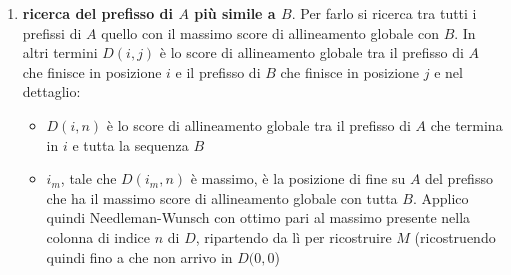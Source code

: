 \documentclass[a4paper,12pt, oneside]{book}
\begin{document}
\begin{enumerate}
  \item \textbf{ricerca del prefisso di $A$ più simile a $B$}. Per farlo si
  ricerca tra tutti i prefissi di $A$ quello con il massimo score di
  allineamento globale con $B$. In altri termini $D(i,j)$ è lo score di
  allineamento globale tra il prefisso di $A$ che finisce in posizione $i$ e il
  prefisso di $B$ che finisce in posizione $j$ e nel dettaglio: 
  \begin{itemize}
    \item $D(i,n)$ è lo score di allineamento globale tra il prefisso di $A$ che
    termina in $i$ e tutta la sequenza $B$
    \item $i_m$, tale che $D(i_m,n)$ è massimo, è la posizione di fine su $A$
    del prefisso che ha il massimo score di allineamento globale con tutta
    $B$. Applico quindi Needleman-Wunsch con ottimo pari al massimo presente
    nella colonna di indice $n$ di $D$, ripartendo da lì per ricostruire $M$
    (ricostruendo quindi fino a che non arrivo in $D(0,0$)
  \end{itemize}
 

\end{enumerate}
\end{document}
